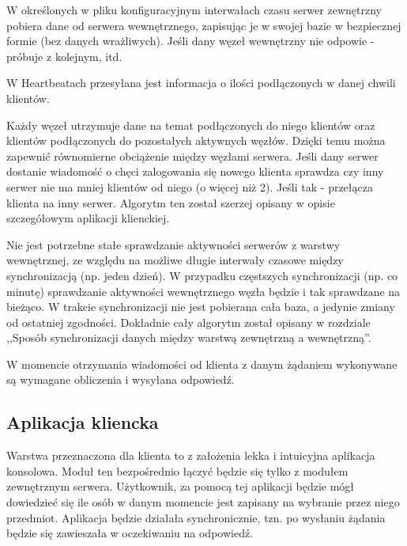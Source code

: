 \par{W określonych w pliku konfiguracyjnym interwałach czasu serwer zewnętrzny pobiera dane od serwera wewnętrznego, zapisując je w swojej bazie w bezpiecznej formie (bez danych wrażliwych). Jeśli dany węzeł wewnętrzny nie odpowie - próbuje z kolejnym, itd.}

\par{W Heartbeatach przesyłana jest informacja o ilości podłączonych w danej chwili klientów.}

\par{Każdy węzeł utrzymuje dane na temat podłączonych do niego klientów oraz klientów podłączonych do pozostałych aktywnych węzłów. Dzięki temu można zapewnić równomierne obciążenie między węzłami serwera. Jeśli dany serwer dostanie wiadomość o chęci zalogowania się nowego klienta sprawdza czy inny serwer nie ma mniej klientów od niego (o więcej niż 2). Jeśli tak - przełącza klienta na inny serwer. Algorytm ten został szerzej opisany w opisie szczegółowym aplikacji klienckiej.}

\par{Nie jest potrzebne stałe sprawdzanie aktywności serwerów z warstwy wewnętrznej, ze względu na możliwe długie interwały czasowe między synchronizacją (np. jeden dzień). W przypadku częstszych synchronizacji (np. co minutę) sprawdzanie aktywności wewnętrznego węzła będzie i tak sprawdzane na bieżąco. W trakcie synchronizacji nie jest pobierana cała baza, a jedynie zmiany od ostatniej zgodności. Dokładnie cały algorytm został opisany w rozdziale ,,Sposób synchronizacji danych między warstwą zewnętrzną a wewnętrzną''.}

\par{W momencie otrzymania wiadomości od klienta z danym żądaniem wykonywane są wymagane obliczenia i wysyłana odpowiedź.}


\subsection[Aplikacja kliencka]{Aplikacja kliencka}

\par{Warstwa przeznaczona dla klienta to z założenia lekka i intuicyjna aplikacja konsolowa. Moduł ten bezpośrednio łączyć będzie się tylko z modułem zewnętrznym serwera. Użytkownik, za pomocą tej aplikacji będzie mógł dowiedzieć się ile osób w danym momencie jest zapisany na wybranie przez niego przedmiot. Aplikacja będzie działała synchronicznie, tzn. po wysłaniu żądania będzie się zawieszała w oczekiwaniu na odpowiedź.}

